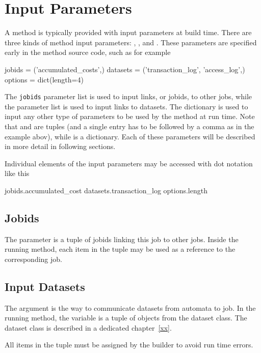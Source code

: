 


\section{Input Parameters}
A method is typically provided with input parameters at build time.
There are three kinds of method input parameters: \jobids, \datasets,
and \options.  These parameters are specified early in the method
source code, such as for example
\begin{python}
jobids = ('accumulated_costs',)
datasets = ('transaction_log', 'access_log',)
options = dict(length=4)
\end{python}
The \texttt{jobids} parameter list is used to input links, or jobids,
to other jobs, while the \datasets parameter list is used to input
links to datasets. The \options dictionary is used to input any other
type of parameters to be used by the method at run time.  Note that
\jobids and \datasets are tuples (and a single entry has to be
followed by a comma as in the example abov), while \options is a
dictionary.  Each of these parameters will be described in more detail
in following sections.

Individual elements of the input parameters may be accessed with dot
notation like this
\begin{python}
jobids.accumulated_cost
datasets.transaction_log
options.length
\end{python}



\subsection*{Jobids}
The \jobids parameter is a tuple of jobids linking this job to other
jobs.  Inside the running method, each item in the \jobids tuple may
be used as a reference to the corresponding job.




\subsection*{Input Datasets}
The \datasets argument is the way to communicate datasets from
automata to job.  In the running method, the \datasets variable is a
tuple of objects from the dataset class.  The dataset class is
described in a dedicated chapter~\ref{xx}.

All items in the \datasets tuple must be assigned by the builder to
avoid run time errors.


